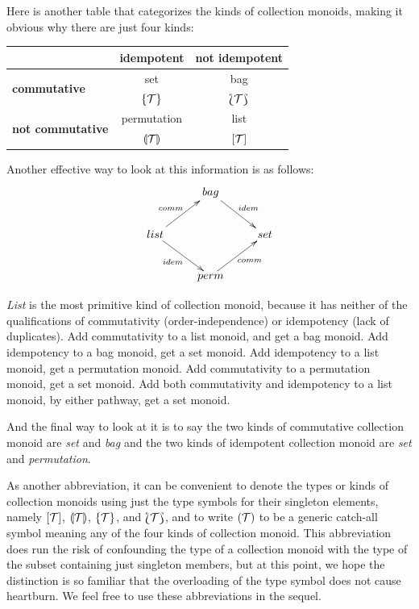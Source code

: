 Here is another table that categorizes the kinds of collection monoids, making it obvious why there are just four kinds:


\begin{center}
  \begin{tabular}{|l||c|c|}
  \hline
  \mbox{}       & \textbf{idempotent} & \textbf{not idempotent}  \\ \hline \hline
  \multirow{2}{*}{\textbf{commutative}}
                           & set               & bag             \\
  \mbox{}                  & $\{\mathcal{T}\}$          & $\Lbag \mathcal{T}\Rbag$ \\ \hline
  \multirow{2}{*}{\textbf{not commutative}}
                           & permutation       & list            \\
  \mbox{}                  & $\llparenthesis \mathcal{T}\rrparenthesis$ & $[\mathcal{T}]$          \\ \hline
  \end{tabular}
\end{center}


Another effective way to look at this information is as follows:
\[
\xymatrix
{
                                   & bag\ar[dr]^{idem}  &     \\
  list\ar[ur]^{comm}\ar[dr]_{idem} &                    & set \\
                                   & perm\ar[ur]_{comm} &     \\
}
\]


\emph{List} is the most primitive kind of collection monoid, because it has neither of the qualifications of commutativity (order-independence) or idempotency (lack of duplicates). Add commutativity to a list monoid, and get a bag monoid. Add idempotency to a bag monoid, get a set monoid. Add idempotency to a list monoid, get a permutation monoid. Add commutativity to a permutation monoid, get a set monoid. Add both commutativity and idempotency to a list monoid, by either pathway, get a set monoid.


And the final way to look at it is to say the two kinds of commutative collection monoid are \emph{set} and \emph{bag} and the two kinds of idempotent collection monoid are \emph{set} and \emph{permutation}.


As another abbreviation, it can be convenient to denote the types or kinds of collection monoids using just the type symbols for their singleton elements, namely $[\mathcal{T}]$, $\llparenthesis \mathcal{T} \rrparenthesis$, $\{\mathcal{T}\}$, and $\Lbag\mathcal{T}\Rbag$, and to write $(\mathcal{T})$ to be a generic catch-all symbol meaning any of the four kinds of collection monoid. This abbreviation does run the risk of confounding the type of a collection monoid with the type of the subset containing just singleton members, but at this point, we hope the distinction is so familiar that the overloading of the type symbol does not cause heartburn. We feel free to use these abbreviations in the sequel.

